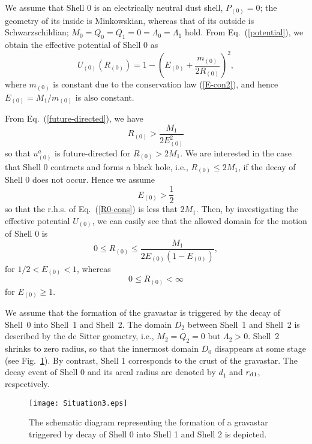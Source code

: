\documentclass[aps,preprint,preprintnumber,nofootinbib,amsmath,amssymb,ascmac,bm,12pt]{revtex4}
\newcommand{\rdo}{r_{\rm d1}}
\newcommand{\mz}{m_{(0)}}
\begin{document}
We assume that Shell 0 is an electrically neutral dust shell, $P_{(0)}=0$; 
the geometry of its inside is Minkowskian, whereas 
that of its outside is Schwarzschildian; $M_0=Q_0=Q_1=0=\Lambda_0=\Lambda_1$ hold. 
From Eq.~(\ref{potential}), we obtain the effective potential of Shell 0 as
$$
U_{(0)}\left(R_{(0)}\right)=1-\left(E_{(0)}+\frac{\mz}{2R_{(0)}}\right)^2,
$$
where $\mz$ is constant due to the conservation law (\ref{E-con2}), 
and hence $E_{(0)}=M_1/\mz$ is also constant. 

From Eq.~(\ref{future-directed}), we have 
\begin{equation}
R_{(0)}>\frac{M_1}{2E_{(0)}^2} \label{R0-cons}
\end{equation}
so that $u_{(0)}^a$ is future-directed for $R_{(0)}>2M_1$. We are interested in the case that  
Shell 0 contracts and forms a black hole, i.e., $R_{(0)}\leq2M_1$, if the decay of Shell 0 
does not occur. Hence we assume  
\begin{equation}
E_{(0)}>\frac{1}{2} \label{E0-cons}
\end{equation}
so that the r.h.s. of Eq.~(\ref{R0-cons}) is less that $2M_1$. 
Then, by investigating the effective potential $U_{(0)}$, 
we can easily see that the allowed domain for the motion of Shell 0 is 
$$
0\leq R_{(0)} \leq \frac{M_1}{2E_{(0)}(1-E_{(0)})},
$$
for $1/2<E_{(0)}<1$, whereas 
$$
0\leq R_{(0)}<\infty
$$
for $E_{(0)}\geq1$. 

We assume that the formation of the gravastar is triggered by the decay 
of Shell~0 into Shell~1 and Shell~2. The domain $D_2$ between Shell~1 and Shell~2 is described 
by the de Sitter geometry, i.e., $M_2=Q_2=0$ but $\Lambda_2>0$. Shell~2 shrinks to zero radius, 
so that the innermost domain $D_0$ disappears at some stage (see Fig.~\ref{G-formation}). 
By contrast, Shell 1 corresponds to the crust of the gravastar. 
The decay event of Shell 0 and its areal radius are denoted by $d_1$ and $\rdo$, respectively. 

\begin{figure}[htbp]
 \begin{center}
 \texttt{[image: Situation3.eps]}
 \end{center}
 \caption{
The schematic diagram representing the formation of a gravastar triggered by 
decay of Shell 0 into Shell 1 and Shell 2 is depicted.   }
 \label{G-formation}
\end{figure}
\end{document}
